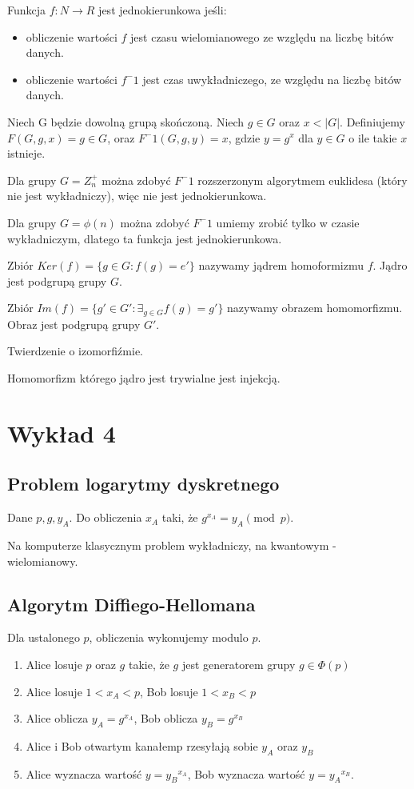 \documentclass{report}
\begin{document}
Funkcja $f : N \to R$ jest jednokierunkowa jeśli:
\begin{itemize}
\item obliczenie wartości $f$ jest czasu wielomianowego ze względu na liczbę bitów danych.
\item obliczenie wartości $f^-1$ jest czas uwykładniczego, ze względu na liczbę bitów danych.
\end{itemize}

Niech G będzie dowolną grupą skończoną. Niech $g \in G$ oraz $x < |G|$. Definiujemy $F(G, g, x) = g \in G$, oraz $F^-1(G, g, y) = x$, gdzie $y=g^x$ dla $y \in G$ o ile takie $x$ istnieje.

Dla grupy $G = Z_n^+$ można zdobyć $F^-1$ rozszerzonym algorytmem euklidesa (który nie jest wykładniczy), więc nie jest jednokierunkowa.

Dla grupy $G = \phi(n)$ można zdobyć $F^-1$ umiemy zrobić tylko w czasie wykładniczym, dlatego ta funkcja jest jednokierunkowa.

Zbiór $Ker(f) = \{ g \in G : f(g) = e' \}$ nazywamy jądrem homoformizmu $f$. Jądro jest podgrupą grupy $G$.

Zbiór $Im(f) = \{ g' \in G' : \exists_{g\in G} f(g) = g' \}$ nazywamy obrazem homomorfizmu. Obraz jest podgrupą grupy $G'$.

Twierdzenie o izomorfiźmie.

Homomorfizm którego jądro jest trywialne jest injekcją.

\chapter{Wykład 4} %

\section{Problem logarytmy dyskretnego}

Dane $p, g, y_A$. Do obliczenia $x_A$ taki, że $g^{x_A} = y_A \pmod{p}$.

Na komputerze klasycznym problem wykładniczy, na kwantowym - wielomianowy.

\section{Algorytm Diffiego-Hellomana}

Dla ustalonego $p$, obliczenia wykonujemy modulo $p$.

\begin{enumerate}
\item Alice losuje $p$ oraz $g$ takie, że $g$ jest generatorem grupy $g \in \Phi(p)$
\item Alice losuje $1 < x_A < p$, Bob losuje $1 < x_B < p$
\item Alice oblicza $y_A = g^{x_A}$, Bob oblicza $y_B = g^{x_B}$
\item Alice i Bob otwartym kanałemp rzesyłają sobie $y_A$ oraz $y_B$
\item Alice wyznacza wartość $y = {y_B}^{x_A}$, Bob wyznacza wartość $y = {y_A}^{x_B}$.
\end{enumerate}
\end{document}
